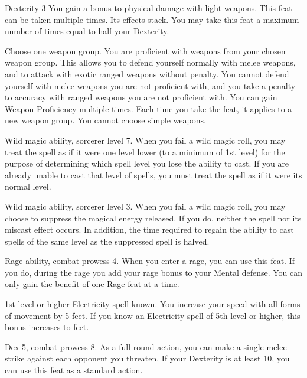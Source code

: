 \featpres Dexterity 3
\featben You gain a  bonus to physical damage with light weapons.
 This feat can be taken multiple times. Its effects stack.
You may take this feat a maximum number of times equal to half your Dexterity.

Choose one weapon group.
\featben You are proficient with weapons from your chosen weapon group.
This allows you to defend yourself normally with melee weapons, and to attack with exotic ranged weapons without penalty.
You cannot defend yourself with melee weapons you are not proficient with, and you take a  penalty to accuracy with ranged weapons you are not proficient with.
You can gain Weapon Proficiency multiple times.
Each time you take the feat, it applies to a new weapon group.
You cannot choose simple weapons.

\featpres Wild magic ability, sorcerer level 7.
\featben When you fail a wild magic roll, you may treat the spell as if it were one level lower (to a minimum of 1st level) for the purpose of determining which spell level you lose the ability to cast.
If you are already unable to cast that level of spells, you must treat the spell as if it were its normal level.

\featpres Wild magic ability, sorcerer level 3.
\featben When you fail a wild magic roll, you may choose to suppress the magical energy released.
If you do, neither the spell nor its miscast effect occurs.
In addition, the time required to regain the ability to cast spells of the same level as the suppressed spell is halved.

\featpres Rage ability, combat prowess 4.
\featben When you enter a rage, you can use this feat. If you do, during the rage you add your rage bonus to your Mental defense.
 You can only gain the benefit of one Rage feat at a time.

\featpre 1st level or higher Electricity spell known.
\featben You increase your speed with all forms of movement by 5 feet.
If you know an Electricity spell of 5th level or higher, this bonus increases to  feet.

\featpres Dex 5, combat prowess 8.
\featben As a full-round action, you can make a single melee strike against each opponent you threaten.
If your Dexterity is at least 10, you can use this feat as a standard action.

